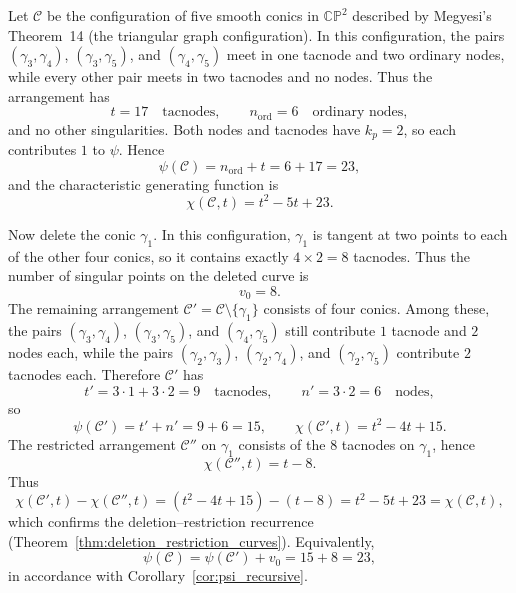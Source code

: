 \documentclass[article,11pt]{amsart} \numberwithin{equation}{section}
\numberwithin{equation}{section}
\begin{document}
{\begin{ex}
	\label{ex:five_conics_17_tacnodes}
	Let $\mathcal C$ be the configuration of five smooth conics in $\mathbb{C}\mathbb{P}^2$
	described by Megyesi's Theorem~14 (the triangular graph configuration).\cite{Megyesi2000} 
	In this configuration, the pairs $(\gamma_3,\gamma_4)$, $(\gamma_3,\gamma_5)$, and $(\gamma_4,\gamma_5)$
	meet in one tacnode and two ordinary nodes, while every other pair
	meets in two tacnodes and no nodes. Thus the arrangement has
	\[
	t = 17 \quad \text{tacnodes}, \qquad n_{\mathrm{ord}}=6 \quad \text{ordinary nodes},
	\]
	and no other singularities. Both nodes and tacnodes have $k_p=2$, so each
	contributes $1$ to $\psi$. Hence
	\[
\psi(\mathcal C)=n_{\mathrm{ord}}+t=6+17=23,
	\]
	and the characteristic generating function is
	\[
	\chi(\mathcal C,t) = t^2 - 5t + 23.
	\]
	
	Now delete the conic $\gamma_1$. In this configuration, $\gamma_1$ is tangent at
	two points to each of the other four conics, so it contains exactly
	$4 \times 2 = 8$ tacnodes. Thus the number of singular points on the
	deleted curve is
	\[
	v_0 = 8.
	\]
	The remaining arrangement $\mathcal C' = \mathcal C \setminus \{\gamma_1\}$
	consists of four conics. Among these, the pairs $(\gamma_3,\gamma_4)$, $(\gamma_3,\gamma_5)$,
	and $(\gamma_4,\gamma_5)$ still contribute $1$ tacnode and $2$ nodes each, while
	the pairs $(\gamma_2,\gamma_3)$, $(\gamma_2,\gamma_4)$, and $(\gamma_2,\gamma_5)$ contribute $2$ tacnodes
	each. Therefore $\mathcal C'$ has
	\[
	t' = 3\cdot 1 + 3\cdot 2 = 9 \quad \text{tacnodes}, \qquad
	n' = 3\cdot 2 = 6 \quad \text{nodes},
	\]
	so
	\[
	\psi(\mathcal C') = t' + n' = 9 + 6 = 15,
	\qquad
	\chi(\mathcal C',t) = t^2 - 4t + 15.
	\]
	The restricted arrangement $\mathcal C''$ on $\gamma_1$ consists of the $8$
	tacnodes on $\gamma_1$, hence
	\[
	\chi(\mathcal C'',t) = t - 8.
	\]
	Thus
	\[
	\chi(\mathcal C',t) - \chi(\mathcal C'',t)
	= (t^2 - 4t + 15) - (t - 8)
	= t^2 - 5t + 23
	= \chi(\mathcal C,t),
	\]
	which confirms the deletion–restriction recurrence (Theorem~\ref{thm:deletion_restriction_curves}).
	Equivalently,
	\[
	\psi(\mathcal C) = \psi(\mathcal C') + v_0 = 15 + 8 = 23,
	\]
	in accordance with Corollary~\ref{cor:psi_recursive}.
\end{ex}

}
\end{document}
